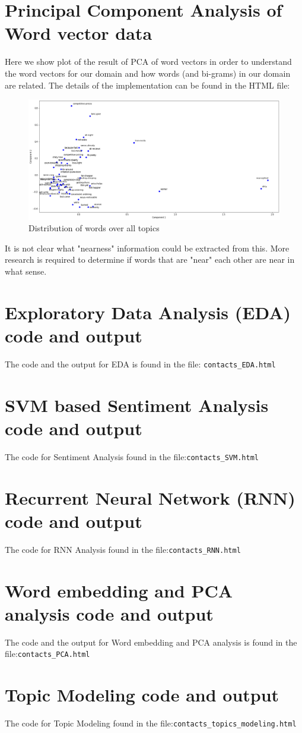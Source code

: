 \documentclass[11pt, letterpaper]{article}
\begin{document}
\newpage
\begin{appendices}
\section{Principal Component Analysis of Word vector data}
Here we show plot of the result of PCA of word vectors in order to understand the word vectors for our domain and how words (and bi-grams) in our domain are related. The details of the implementation can be found in the HTML file:
\begin{figure}[H]
         \includegraphics[width=\textwidth]{word_vec_pca.png}
         \caption{Distribution of words over all topics}
         \label{fig:pca}
     \end{figure}
It is not clear what "nearness" information could be extracted from this. More research is required to determine if words that are "near" each other are near in what sense.

\section{Exploratory Data Analysis (EDA) code and output}
The code and the output for EDA is found in the file: \verb|contacts_EDA.html|

\section{SVM based Sentiment Analysis code and output}
The code for Sentiment Analysis found in the file:\verb|contacts_SVM.html|

\section{Recurrent Neural Network (RNN) code and output}
The code for RNN Analysis found in the file:\verb|contacts_RNN.html|

\section{Word embedding and PCA analysis code and output}
The code and the output for Word embedding and PCA analysis is found in the file:\verb|contacts_PCA.html|

\section{Topic Modeling code and output}
The code for Topic Modeling found in the file:\verb|contacts_topics_modeling.html|


\end{appendices}
\end{document}
